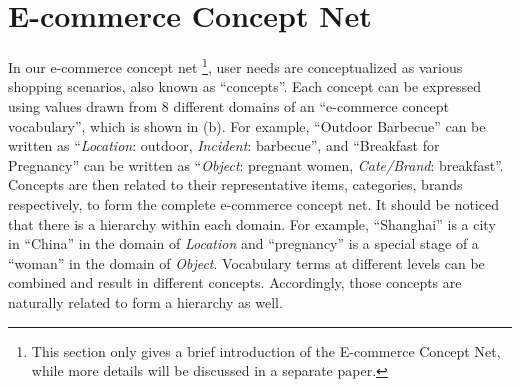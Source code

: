 \section{E-commerce Concept Net} 
\label{sec:ecn}

In our e-commerce concept net \footnote{This section only gives
a brief introduction of the E-commerce Concept Net, while more details will be 
discussed in a separate paper.},
user needs are conceptualized as various shopping scenarios, also known as ``concepts''.
Each concept can be expressed using values drawn from $8$ different domains of
an ``e-commerce concept vocabulary'', which is shown in  (b).
For example, ``Outdoor Barbecue'' can be written as 
``\textit{Location}: outdoor, \textit{Incident}: barbecue'', 
and ``Breakfast for Pregnancy'' can be written as ``\textit{Object}: pregnant women, \textit{Cate/Brand}: breakfast''.
Concepts are then related to their representative items, categories, brands respectively, to form the complete e-commerce concept net.
It should be noticed that there is a hierarchy within each domain. For example, ``Shanghai'' is a city in ``China'' in the domain of \textit{Location} and ``pregnancy'' is a special stage of a ``woman'' in the domain of \textit{Object}.  Vocabulary terms at different levels can be combined and result in different concepts.
Accordingly, those concepts are naturally related to form a hierarchy as well.





